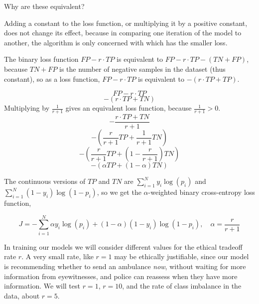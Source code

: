 Why are these equivalent?

Adding a constant to the loss function, or multiplying it by a positive constant, does not change its effect, because in comparing one iteration of the model to another, the algorithm is only concerned with which has the smaller loss.

The binary loss function $FP - r \cdot TP$ is equivalent to $FP - r \cdot TP - (TN+FP)$, because $TN+FP$ is the number of negative samples in the dataset (thus constant), so as a loss function,
$FP - r \cdot TP$ is equivalent to $-(r \cdot TP+ TP)$.


$$FP - r \cdot TP$$
$$-(r \cdot TP + TN)$$
Multiplying by $\frac{1}{r+1}$ gives an equivalent loss function, because $\frac{1}{r+1}>0$.
$$-\frac{r \cdot TP + TN}{r+1}$$
$$- \left( \frac{r}{r+1} TP + \frac{1}{r+1} TN\right)$$
$$- \left( \frac{r}{r+1} TP + \left( 1 - \frac{r}{r+1} \right) TN \right)$$
$$- (\alpha TP + (1 - \alpha) TN) $$

The continuous versions of $TP$ and $TN$ are 
$ \displaystyle \sum_{i=1}^N y_i \log( p_i)$
and
$ \displaystyle \sum_{i=1}^N (1-y_i) \log( 1 - p_i)$, so we get the $\alpha$-weighted binary cross-entropy loss function, 

$$J = -\sum_{i=1}^N \alpha y_i \log( p_i) + (1-\alpha)(1-y_i) \log( 1 - p_i), \quad \alpha = \frac{r}{r+1}$$

In training our models we will consider different values for the ethical tradeoff rate $r$.  A very small rate, like $r=1$ may be ethically justifiable, since our model is recommending whether to send an ambulance {\it now}, without waiting for more information from eyewitnesses, and police can reassess when they have more information.  We will test $r=1$, $r=10$, and the rate of class imbalance in the data, about $r=5$.  

